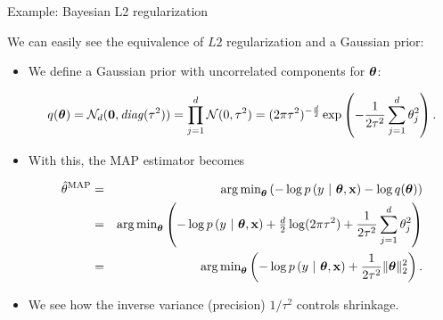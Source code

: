 \begin{vbframe}{Example: Bayesian L2 regularization}

\small We can easily see the equivalence of $L2$ regularization and a Gaussian
prior:

\begin{itemize}
  \small
  \item We define a Gaussian prior with uncorrelated components for $\bm{\theta}$:
  \begin{footnotesize}
    $$q(\bm{\theta}) = \mathcal{N}_d(\bm{0}, \mathit{diag}(\tau^2))
    = \prod_{j = 1}^d  \mathcal{N}(0, \tau^2)
    = (2\pi\tau^2)^{-\frac{d}{2}} \exp \left( - \frac{1}{2\tau^2} \sum_{j = 1}^d
    \theta_j^2 \right).$$
  \end{footnotesize}
  \item With this, the MAP estimator becomes
  \begin{footnotesize}
  \begin{eqnarray*}
    \hat{\theta}^{\text{MAP}} &=& \operatorname{arg\,min}_{\bm{\theta}} \left(
    - \log p\left(y ~|~ \bm{\theta}, \mathbf{x} \right) - \log q(\bm{\theta})
    \right) \\
    &=& \operatorname{arg\,min}_{\bm{\theta}} \left(
    - \log p\left(y ~|~ \bm{\theta}, \mathbf{x} \right) + \tfrac{d}{2} \log(2\pi \tau^2) +
    \frac{1}{2\tau^2} \sum_{j = 1}^d \theta_j^2
    \right) \\
    &=& \operatorname{arg\,min}_{\bm{\theta}} \left(
    - \log p\left(y ~|~ \bm{\theta}, \mathbf{x} \right) + \frac{1}{2\tau^2} \| \bm{\theta} \|_2^2
    \right).
  \end{eqnarray*}
  \end{footnotesize}
  \item We see how the inverse variance (precision) $1/\tau^2$ controls shrinkage.
\end{itemize}



\end{vbframe}
